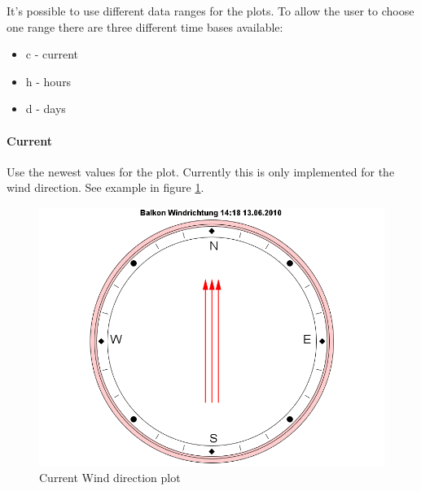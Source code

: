 It's possible to use different data ranges for the plots. To allow the user to choose one range there are three different time bases available:
\begin{itemize}
	\item c - current
	\item h - hours
	\item d - days
\end{itemize}

\paragraph{Current} %
\label{par:current}
Use the newest values for the plot. Currently this is only implemented for the wind direction. See example in figure \ref{fig:current}.
\begin{figure}[ht]
    \centering
    \includegraphics[width=0.9\linewidth]{master/plot_examplec.png}
    \caption{Current Wind direction plot}
    \label{fig:current}
\end{figure}

